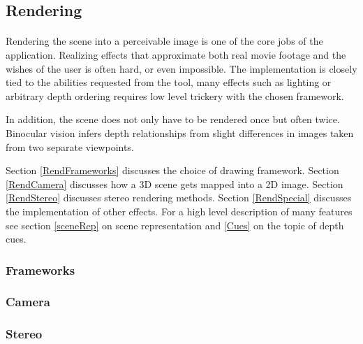 \subsection{Rendering}
\paragraph{}
Rendering the scene into a perceivable image is one of the core jobs of the application.
Realizing effects that approximate both real movie footage and the wishes of the user is often hard, or even impossible.
The implementation is closely tied to the abilities requested from the tool, many effects such as lighting or arbitrary depth ordering requires low level trickery with the chosen framework.

In addition, the scene does not only have to be rendered once but often twice.
Binocular vision infers depth relationships from slight differences in images taken from two separate viewpoints.

Section \ref{RendFrameworks} discusses the choice of drawing framework.
Section \ref{RendCamera} discusses how a 3D scene gets mapped into a 2D image.
Section \ref{RendStereo} discusses stereo rendering methods.
Section \ref{RendSpecial} discusses the implementation of other effects.
For a high level description of many features see section \ref{sceneRep} on scene representation and \ref{Cues} on the topic of depth cues.

\subsubsection{Frameworks\label{RendFrameworks}}
\paragraph{}

\subsubsection{Camera\label{RendCamera}}
\paragraph{}

\subsubsection{Stereo\label{RendStereo}}
